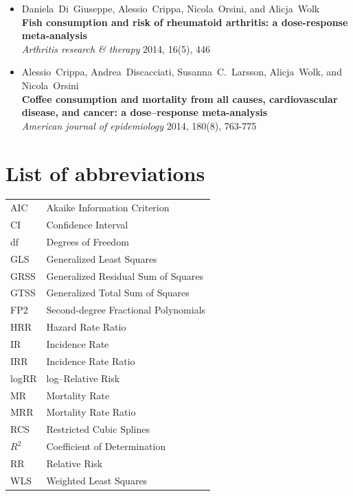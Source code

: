 \documentclass[11pt,a4paper,twoside,openany]{book}\usepackage{knitr}
\makeatletter
\def\cleardoublepage{\clearpage\if@twoside
\ifodd\c@page
\else\hbox{}\thispagestyle{empty}\newpage
\if@twocolumn\hbox{}\newpage\fi\fi\fi}
\makeatother
\begin{document}
{\begin{itemize}
\item Daniela~Di~Giuseppe, Alessio~Crippa, Nicola~Orsini, and Alicja~Wolk \\ \textbf{Fish consumption and risk of rheumatoid arthritis: a dose-response meta-analysis} \\ \textit{Arthritis research \& therapy} 2014, 16(5), 446
\item Alessio~Crippa, Andrea~Discacciati, Susanna~C.~Larsson, Alicja~Wolk, and Nicola~Orsini \\ \textbf{Coffee consumption and mortality from all causes, cardiovascular disease, and cancer: a dose--response meta-analysis} \\ \textit{American journal of epidemiology} 2014, 180(8), 763-775
\end{itemize}
\cleardoublepage
{}
\tableofcontents
{} 

%

\chapter*{List of abbreviations}
\begin{tabular}{ll}

AIC & Akaike Information Criterion \\
CI & Confidence Interval \\
df & Degrees of Freedom \\
GLS & Generalized Least Squares \\
GRSS & Generalized Residual Sum of Squares \\
GTSS & Generalized Total Sum of Squares \\
FP2 & Second-degree Fractional Polynomials \\
HRR & Hazard Rate Ratio \\
IR & Incidence Rate \\
IRR & Incidence Rate Ratio \\
logRR & log--Relative Risk \\
MR & Mortality Rate \\
MRR & Mortality Rate Ratio \\
RCS & Restricted Cubic Splines \\
$R^2$ & Coefficient of Determination \\
RR & Relative Risk \\
WLS & Weighted Least Squares



\end{tabular}}
\end{document}
